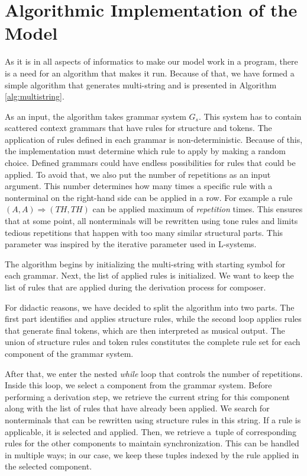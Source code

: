 \section{Algorithmic Implementation of the Model}
\label{sec:algimp}
As it is in all aspects of informatics to make our model work in a program, there is a need for an algorithm that makes it run. Because of that, we have formed a simple algorithm that generates multi-string and is presented in Algorithm \ref{alg:multistring}.

As an input, the algorithm takes grammar system $G_s$. This system has to contain scattered context grammars that have rules for structure and tokens. The application of rules defined in each grammar is non-deterministic. Because of this, the implementation must determine which rule to apply by making a random choice. Defined grammars could have endless possibilities for rules that could be applied. To avoid that, we also put the number of repetitions as an input argument. This number determines how many times a specific rule with a nonterminal on the right-hand side can be applied in a row. For example a rule $(A, A) \Rightarrow (TH, TH)$ can be applied maximum of \textit{repetition} times. This ensures that at some point, all nonterminals will be rewritten using tone rules and limits tedious repetitions that happen with too many similar structural parts. This parameter was inspired by the iterative parameter used in L-systems.

The algorithm begins by initializing the multi-string with starting symbol for each grammar. Next, the list of applied rules is initialized. We want to keep the list of rules that are applied during the derivation process for composer.

For didactic reasons, we have decided to split the algorithm into two parts. The first part identifies and applies structure rules, while the second loop applies rules that generate final tokens, which are then interpreted as musical output. The union of structure rules and token rules constitutes the complete rule set for each component of the grammar system.

After that, we enter the nested \textit{while} loop that controls the number of repetitions. Inside this loop, we select a component from the grammar system. Before performing a derivation step, we retrieve the current string for this component along with the list of rules that have already been applied. We search for nonterminals that can be rewritten using structure rules in this string. If a rule is applicable, it is selected and applied. Then, we retrieve a~tuple of corresponding rules for the other components to maintain synchronization. This can be handled in multiple ways; in our case, we keep these tuples indexed by the rule applied in the selected component.

